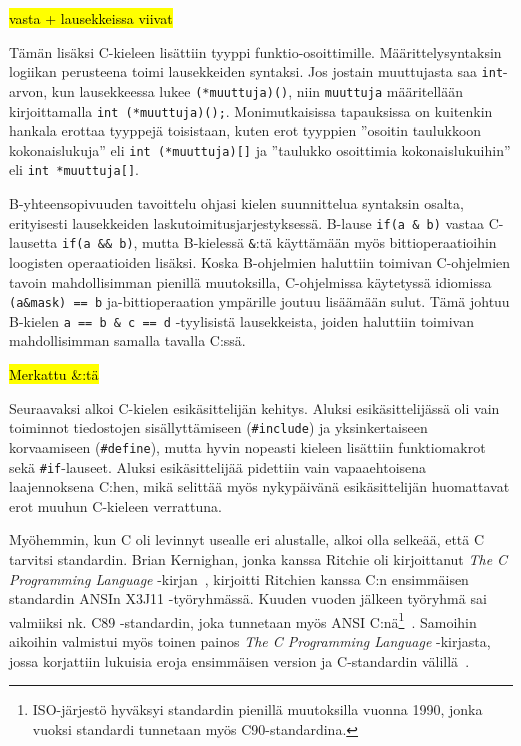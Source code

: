 \hl{vasta + lausekkeissa viivat}

Tämän lisäksi C-kieleen lisättiin tyyppi funktio-osoittimille.
Määrittelysyntaksin logiikan perusteena toimi lausekkeiden syntaksi. Jos
jostain muuttujasta saa \texttt{int}-arvon, kun lausekkeessa lukee
\texttt{(*muuttuja)()}, niin \texttt{muuttuja} määritellään kirjoittamalla
\texttt{int~(*muuttuja)();}. Monimutkaisissa tapauksissa on kuitenkin hankala
erottaa tyyppejä toisistaan, kuten erot tyyppien ''osoitin taulukkoon
kokonaislukuja'' eli \texttt{int~(*muuttuja)[]} ja ''taulukko osoittimia
kokonaislukuihin'' eli \texttt{int~*muuttuja[]}.

B-yhteensopivuuden tavoittelu ohjasi kielen suunnittelua syntaksin osalta,
erityisesti lausekkeiden laskutoimitusjarjestyksessä. B-lause
\texttt{if(a~\&~b)} vastaa C-lausetta \texttt{if(a~\&\&~b)}, mutta B-kielessä
\texttt{\&}:tä käyttämään myös bittioperaatioihin loogisten
operaatioiden lisäksi. Koska B-ohjelmien haluttiin toimivan C-ohjelmien tavoin
mahdollisimman pienillä muutoksilla, C-ohjelmissa käytetyssä idiomissa
\texttt{(a\&mask)~==~b} ja-bittioperaation ympärille joutuu lisäämään sulut.
Tämä johtuu B-kielen \texttt{a == b \& c == d} -tyylisistä lausekkeista, joiden
haluttiin toimivan mahdollisimman samalla tavalla C:ssä.

\hl{Merkattu \&:tä}

Seuraavaksi alkoi C-kielen esikäsittelijän kehitys. Aluksi esikäsittelijässä
oli vain toiminnot tiedostojen sisällyttämiseen (\texttt{\#include}) ja
yksinkertaiseen korvaamiseen (\texttt{\#define}), mutta hyvin nopeasti
kieleen lisättiin funktiomakrot sekä \texttt{\#if}-lauseet. Aluksi
esikäsittelijää pidettiin vain vapaaehtoisena laajennoksena C:hen, mikä
selittää myös nykypäivänä esikäsittelijän huomattavat erot muuhun C-kieleen
verrattuna.

Myöhemmin, kun C oli levinnyt usealle eri alustalle, alkoi olla selkeää, että C
tarvitsi standardin. Brian Kernighan, jonka kanssa Ritchie oli kirjoittanut
\emph{The C Programming Language} -kirjan~\citep{krfirst}, kirjoitti Ritchien
kanssa C:n ensimmäisen standardin ANSIn X3J11 -työryhmässä. Kuuden vuoden
jälkeen työryhmä sai valmiiksi nk. C89 -standardin, joka tunnetaan myös ANSI
C:nä\footnote{ISO-järjestö hyväksyi standardin pienillä muutoksilla vuonna
1990, jonka vuoksi standardi tunnetaan myös C90-standardina.}~\citep{C89}.
Samoihin aikoihin valmistui myös toinen painos \emph{The C Programming
Language} -kirjasta, jossa korjattiin lukuisia eroja ensimmäisen version ja
C-standardin välillä~\citep{krsecond}.

